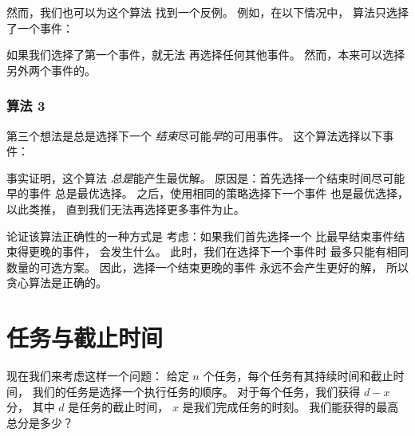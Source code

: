然而，我们也可以为这个算法
找到一个反例。
例如，在以下情况中，
算法只选择了一个事件：
\begin{center}
\end{center}
如果我们选择了第一个事件，就无法
再选择任何其他事件。
然而，本来可以选择
另外两个事件的。

\subsubsection*{算法 3}

第三个想法是总是选择下一个
\emph{结束}尽可能\emph{早}的可用事件。
这个算法选择以下事件：
\begin{center}
\end{center}

事实证明，这个算法
\emph{总是}能产生最优解。
原因是：首先选择一个结束时间尽可能早的事件
总是最优选择。
之后，使用相同的策略选择下一个事件
也是最优选择，以此类推，
直到我们无法再选择更多事件为止。

论证该算法正确性的一种方式是
考虑：如果我们首先选择一个
比最早结束事件结束得更晚的事件，
会发生什么。
此时，我们在选择下一个事件时
最多只能有相同数量的可选方案。
因此，选择一个结束更晚的事件
永远不会产生更好的解，
所以贪心算法是正确的。

\section{任务与截止时间}

现在我们来考虑这样一个问题：
给定 $n$ 个任务，每个任务有其持续时间和截止时间，
我们的任务是选择一个执行任务的顺序。
对于每个任务，我们获得 $d-x$ 分，
其中 $d$ 是任务的截止时间，
$x$ 是我们完成任务的时刻。
我们能获得的最高总分是多少？

